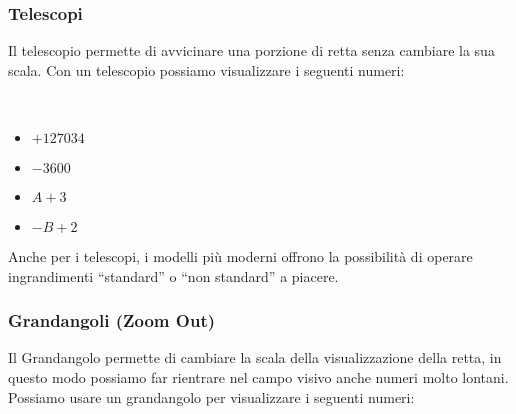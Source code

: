 \subsubsection{Telescopi}
\label{subsec:insnum_telescopi}

Il telescopio permette di avvicinare una porzione di retta senza cambiare 
la sua scala. Con un telescopio possiamo visualizzare i seguenti numeri:


\begin{esempio} ~

\begin{multicols}{4}
\begin{itemize}[nosep]
 \item \(+127034\)
 \item \(-3600\)
 \item \(A+3\)
 \item \(-B+2\)
\end{itemize}
\end{multicols}
\vspace{-5mm}

\begin{inaccessibleblock}
\begin{minipage}{.48\linewidth}
 \begin{center}
\scalebox{0.7}{\telescopioa}
 \end{center}
\end{minipage}
\hfill
\begin{minipage}{.48\linewidth}
 \begin{center}
\scalebox{0.7}{\telescopiob}
 \end{center}
\end{minipage}
\end{inaccessibleblock}
\end{esempio}

Anche per i telescopi, i modelli più moderni offrono la possibilità di 
operare ingrandimenti ``standard'' o ``non standard'' a piacere.

\subsubsection{Grandangoli (Zoom Out)}
\label{subsec:insnum_zoom}

Il Grandangolo permette di cambiare la scala della visualizzazione della 
retta, in questo modo possiamo far rientrare nel campo visivo anche numeri 
molto lontani.
Possiamo usare un grandangolo per visualizzare i seguenti numeri:

